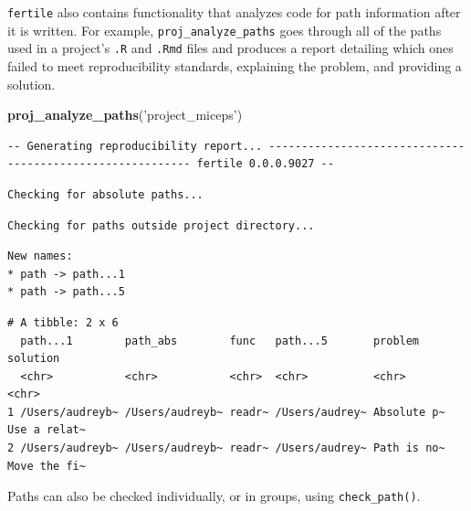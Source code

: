 \documentclass[12pt,twoside]{reedthesis}
\newenvironment{Shaded}{\begin{snugshade}}{\end{snugshade}}
\newcommand{\KeywordTok}[1]{\textcolor[rgb]{0.13,0.29,0.53}{\textbf{#1}}}
\newcommand{\StringTok}[1]{\textcolor[rgb]{0.31,0.60,0.02}{#1}}
\newcommand{\NormalTok}[1]{#1}
\begin{document}
\texttt{fertile} also contains functionality that analyzes code for path
information after it is written. For example,
\texttt{proj\_analyze\_paths} goes through all of the paths used in a
project's \texttt{.R} and \texttt{.Rmd} files and produces a report
detailing which ones failed to meet reproducibility standards,
explaining the problem, and providing a solution.

\footnotesize
\begin{Shaded}
\begin{Highlighting}[]
\KeywordTok{proj_analyze_paths}\NormalTok{(}\StringTok{'project_miceps'}\NormalTok{)}
\end{Highlighting}
\end{Shaded}
\begin{verbatim}
-- Generating reproducibility report... ---------------------------------------------------------- fertile 0.0.0.9027 --
\end{verbatim}
\begin{verbatim}
Checking for absolute paths...
\end{verbatim}
\begin{verbatim}
Checking for paths outside project directory...
\end{verbatim}
\begin{verbatim}
New names:
* path -> path...1
* path -> path...5
\end{verbatim}
\begin{verbatim}
# A tibble: 2 x 6
  path...1        path_abs        func   path...5       problem     solution    
  <chr>           <chr>           <chr>  <chr>          <chr>       <chr>       
1 /Users/audreyb~ /Users/audreyb~ readr~ /Users/audrey~ Absolute p~ Use a relat~
2 /Users/audreyb~ /Users/audreyb~ readr~ /Users/audrey~ Path is no~ Move the fi~
\end{verbatim}
\normalsize

Paths can also be checked individually, or in groups, using
\texttt{check\_path()}.
\end{document}
